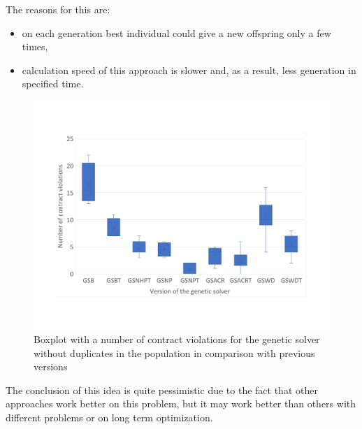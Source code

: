 The reasons for this are:

\begin{itemize}
	\item on each generation best individual could give a new offspring only a few times, 
	\item calculation speed of this approach is slower and, as a result, less generation in specified time.
\end{itemize}

\begin{figure}
	\centering
	\includegraphics[width=\textwidth]{images/BoxPlotSolverNoDuplicates.pdf}
	\caption[Boxplot with a number of contract violations for the genetic solver without duplicates in the population in comparison with previous versions]{Boxplot with a number of contract violations for the genetic solver without duplicates in the population in comparison with previous versions}
	\label{fig:boxplotsolverNoDuplicates}
\end{figure} 

The conclusion of this idea is quite pessimistic due to the fact that other approaches work better on this problem, but it may work better than others with different problems or on long term optimization.


